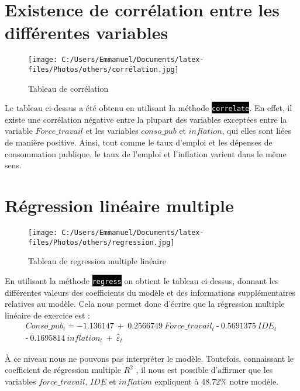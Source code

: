 \documentclass[a4paper, 12pt, openany]{book}
\begin{document}
\section{Existence de corrélation entre les différentes variables}
\vspace*{-.5cm}
\begin{figure}[H]
    \centering
    \texttt{[image: C:/Users/Emmanuel/Documents/latex-files/Photos/others/corrélation.jpg]}
    \caption{Tableau de corrélation}
    \label{}
\end{figure}
Le tableau ci-dessus a été obtenu en utilisant la méthode \colorbox{black}{\textcolor{white}{\texttt{correlate}}}.
En effet, il existe une corrélation négative entre la plupart des variables exceptées entre la variable $Force\_travail$ et les variables $conso\_pub$ et $inflation$, qui elles sont liées de manière positive. Ainsi, tout comme le taux d'emploi et les dépenses de consommation publique, le taux de l'emploi et l'inflation varient dans le même sens.

\vspace*{-0.8cm}
\section{Régression linéaire multiple}

\begin{figure}[H]
    \centering
    \texttt{[image: C:/Users/Emmanuel/Documents/latex-files/Photos/others/regression.jpg]}
    \caption{Tableau de regression multiple linéaire}
    \label{}
    
\end{figure}

En utilisant la méthode \colorbox{black}{\textcolor{white}{\texttt{regress}}} on obtient le tableau ci-dessus, donnant les différentes valeurs des coefficients du modèle et des informations supplémentaires relatives au modèle. Cela nous permet donc d'écrire que la régression multiple linéaire de exercice est :
\vspace*{-.5cm}
\begin{multline*}
	Conso\_pub_t= -1.136147\ +\ 0.2566749\ Force\_travail_t\ ‐ \ 0.5691375\ IDE_t\ \\‐ \ 0.1695814\ inflation_t\ +\ \hat{\varepsilon}_t
\end{multline*}
\vspace*{-1.5cm}
\begin{spacing}{1.4}
À ce niveau nous ne pouvons pas interpréter le modèle. Toutefois, connaissant le coefficient de régression multiple $R^2$ , il nous est possible d'affirmer que les variables $force\_travail$, $IDE$ et $inflation$ expliquent à 48.72\% notre modèle.
\end{spacing}
\vspace*{-0.5cm}
\end{document}
